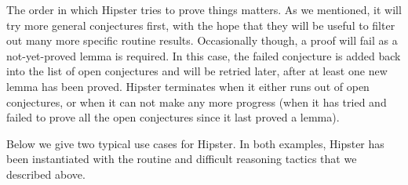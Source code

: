 The order in which Hipster tries to prove things matters. As we
mentioned, it will try more general conjectures first, with the hope
that they will be useful to filter out many more specific routine
results. Occasionally though, a proof will fail as a not-yet-proved
lemma is required. In this case, the failed conjecture is added back
into the list of open conjectures and will be retried later, after at
least one new lemma has been proved. Hipster terminates when it either
runs out of open conjectures, or when it can not make any more
progress (when it has tried and failed to prove all the open
conjectures since it last proved a lemma).

Below we give two typical use cases for Hipster. In both examples,
Hipster has been instantiated with the routine and difficult reasoning
tactics that we described above.

